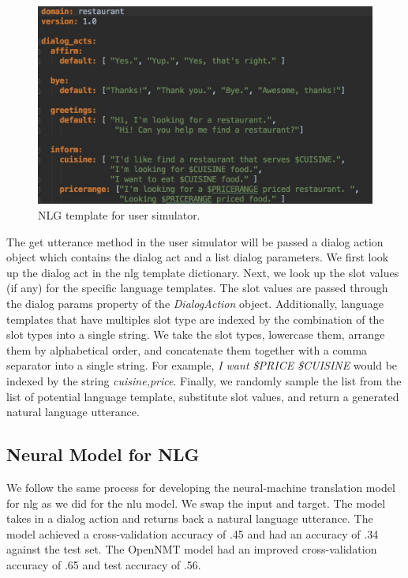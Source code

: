 \begin{figure}[h!]
	\centering
	\includegraphics[scale=.35]{diagrams/nlg_template_restaurant.jpeg}
	\caption{ NLG template for user simulator. }
	\label{fig:res_nlg}
\end{figure}

The get utterance method in the user simulator will be passed a dialog action object which contains the dialog act and a list dialog parameters. We first look up the dialog act in the nlg template dictionary. Next, we look up the slot values (if any) for the specific language templates. The slot values are passed through the dialog params property of the \textit{DialogAction} object. Additionally, language templates that have multiples slot type are indexed by the combination of the slot types into a single string. We take the slot types, lowercase them, arrange them by alphabetical order, and concatenate them together with a comma separator into a single string. For example, \textit{I want \$PRICE \$CUISINE} would be indexed by the string \textit{cuisine,price}. Finally, we randomly sample the list from the list of potential language template, substitute slot values, and return a generated natural language utterance. 


\subsection{Neural Model for NLG}

We follow the same process for developing the neural-machine translation model for nlg as we did for the nlu model. We swap the input and target. The model takes in a dialog action and returns back a natural language utterance. The \cite{brownlee_2017} model achieved a cross-validation accuracy of .45 and had an accuracy of .34 against the test set. The OpenNMT model had an improved cross-validation accuracy of .65 and test accuracy of .56.  

